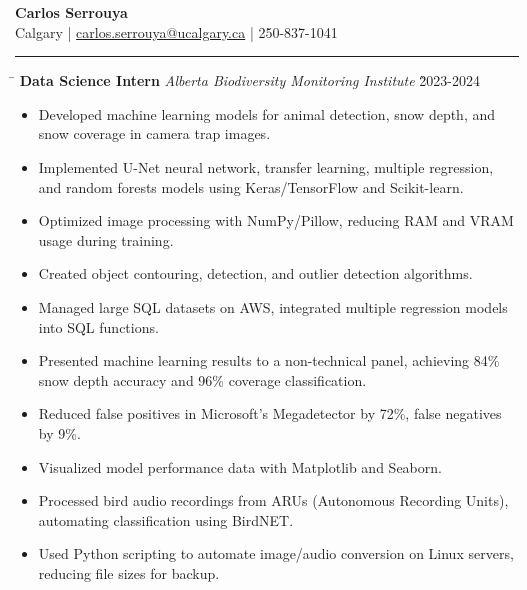 \documentclass[a4paper,11pt]{article}
\def\locationh{\hspace{7cm}}
\def\titlev{\vspace{.5cm}}
\def\sectionv{\vspace{.2cm}}
\def\subsectionv{\vspace{-5.3ex}}
\def\postpointsv{\vspace{0cm}}
\begin{document}
\begin{center}
    {\LARGE \textbf{Carlos Serrouya}} \\
    Calgary | \href{mailto:carlos.serrouya@ucalgary.ca}{carlos.serrouya@ucalgary.ca} | 250-837-1041 \\
\end{center}

\titlev

\noindent {}
\vspace{-2.35em} %
\par\noindent
\rule{\textwidth}{0.4pt}

\sectionv

\noindent \begin{tabbing}
    \locationh \= \kill
    \textbf{Data Science Intern} \> \textit{Alberta Biodiversity Monitoring Institute} \` 2023-2024 \\
\end{tabbing}


\begin{itemize}[leftmargin=.5cm, itemsep=.1cm, before=\subsectionv, after=\postpointsv]
    \item Developed machine learning models for animal detection, snow depth, and snow coverage in camera trap images.
    \item Implemented U-Net neural network, transfer learning, multiple regression, and random forests models using Keras/TensorFlow and Scikit-learn.
    \item Optimized image processing with NumPy/Pillow, reducing RAM and VRAM usage during training.
    \item Created object contouring, detection, and outlier detection algorithms.
    \item Managed large SQL datasets on AWS, integrated multiple regression models into SQL functions.
    \item Presented machine learning results to a non-technical panel, achieving 84\% snow depth accuracy and 96\% coverage classification.
    \item Reduced false positives in Microsoft's Megadetector by 72\%, false negatives by 9\%.
    \item Visualized model performance data with Matplotlib and Seaborn.
    \item Processed bird audio recordings from ARUs (Autonomous Recording Units), automating classification using BirdNET.
    \item Used Python scripting to automate image/audio conversion on Linux servers, reducing file sizes for backup.
\end{itemize}
\end{document}

